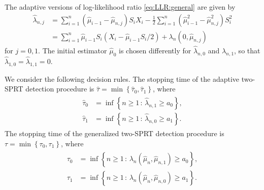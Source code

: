 \documentclass{article}
\renewcommand{\geq}{\geqslant}
\newcommand{\set}[1]{\left\{ #1 \right\}}
\newcommand{\cset}[3][:]{\left\{#2 \,#1\, #3\right\}}
\newcommand{\hlambda}{\hat{\lambda}}
\newcommand{\hmu}{\hat{\mu}}
\newcommand{\htau}{\hat{\tau}}
\begin{document}
The adaptive versions of log-likelihood ratio \eqref{eq:LLR:general} are given by
\begin{align} \label{eq:LLR:adaptive}
    \hlambda_{n, j}
        &= \sum_{i = 1}^{n} (\hmu_{i - 1} - \hmu_{n, j}) S_i X_i
        - \frac{1}{2} \sum_{i = 1}^{n} (\hmu_{i - 1}^2 - \hmu_{n, j}^{2}) S_i^2 \\
        &= \sum_{i = 1}^{n} \hmu_{i - 1} S_i (X_i - \hmu_{i - 1} S_i / 2)
        + \lambda_n(0, \hmu_{n, j}) \nonumber
\end{align}
for $j = 0, 1$. The initial estimator $\hmu_0$ is chosen differently for $\hlambda_{n, 0}$ and $\hlambda_{n, 1}$, so that $\hlambda_{1, 0} = \hlambda_{1, 1} = 0$.

We consider the following decision rules.
The stopping time of the adaptive two-SPRT detection procedure is $\htau = \min\set{\htau_0,\htau_1}$, where
\begin{align} \label{eq:sprt:adaptive}
    \begin{split}
        \htau_0 &= \inf \cset{n \geq 1}{\hlambda_{n, 1} \geq a_0}, \\
        \htau_1 &= \inf \cset{n \geq 1}{\hlambda_{n, 0} \geq a_1}.
    \end{split}
\end{align}
The stopping time of the generalized two-SPRT detection procedure is $\tau = \min\set{\tau_0,\tau_1}$, where
\begin{align} \label{eq:sprt:adaptive}
    \begin{split}
        \tau_0 &= \inf \cset{n \geq 1}{\lambda_n(\hmu_n, \hmu_{n, 1}) \geq a_0}, \\
        \tau_1 &= \inf \cset{n \geq 1}{\lambda_n(\hmu_n, \hmu_{n, 0}) \geq a_1}.
    \end{split}
\end{align}
\end{document}
